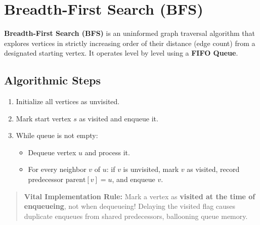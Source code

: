 \section{Breadth-First Search (BFS)}

\textbf{Breadth-First Search (BFS)} is an uninformed graph traversal algorithm that explores vertices in strictly increasing order of their distance (edge count) from a designated starting vertex. It operates level by level using a \textbf{FIFO Queue}.

\subsection{Algorithmic Steps}
\begin{enumerate}
    \item Initialize all vertices as unvisited.
    \item Mark start vertex $s$ as visited and enqueue it.
    \item While queue is not empty:
    \begin{itemize}
        \item Dequeue vertex $u$ and process it.
        \item For every neighbor $v$ of $u$: if $v$ is unvisited, mark $v$ as visited, record predecessor $\text{parent}[v] = u$, and enqueue $v$.
    \end{itemize}
\end{enumerate}

\begin{quote}
\textbf{Vital Implementation Rule:} Mark a vertex as \textbf{visited at the time of enqueueing}, not when dequeueing! Delaying the visited flag causes duplicate enqueues from shared predecessors, ballooning queue memory.
\end{quote}

